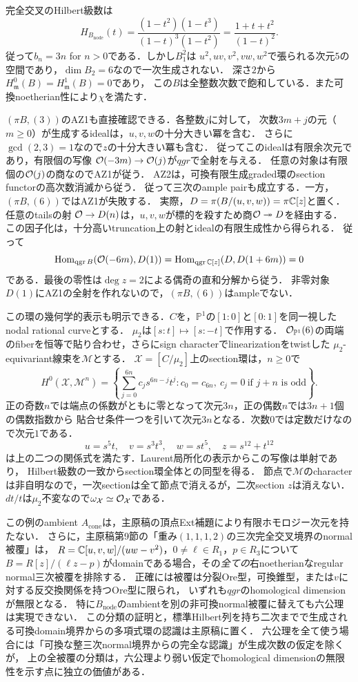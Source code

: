 \documentclass[11pt,a4paper]{ltjsarticle}
\begin{document}
完全交叉のHilbert級数は
\[
 H_{B_{\mathrm{node}}}(t)
 =\frac{(1-t^2)(1-t^3)}{(1-t)^3(1-t^2)}
 =\frac{1+t+t^2}{(1-t)^2}.
\]
従って$b_n=3n$ for $n>0$である．しかし$B_1^2$は
$u^2,uv,v^2,vw,w^2$で張られる次元$5$の空間であり，$\dim B_2=6$なので一次生成されない．
深さ$2$から$H^0_{\mathfrak m}(B)=H^1_{\mathfrak m}(B)=0$であり，
この$B$は全整数次数で飽和している．また可換noetherian性により$\chi$を満たす．

$(\pi B,(3))$のAZ1も直接確認できる．各整数$j$に対して，
次数$3m+j$の元（$m\geq0$）が生成するidealは，$u,v,w$の十分大きい冪を含む．
さらに$\gcd(2,3)=1$なので$z$の十分大きい冪も含む．
従ってこのidealは有限余次元であり，有限個の写像
$\mathcal O(-3m)\to\mathcal O(j)$が$qgr$で全射を与える．
任意の対象は有限個の$\mathcal O(j)$の商なのでAZ1が従う．
AZ2は，可換有限生成graded環のsection functorの高次数消滅から従う．
従って三次のample pairも成立する．一方，$(\pi B,(6))$ではAZ1が失敗する．
実際，$D=\pi(B/(u,v,w))=\pi\mathbb C[z]$と置く．任意のtailsの射
$\mathcal O\to D(n)$は，$u,v,w$が標的を殺すため商$\mathcal O\twoheadrightarrow D$を経由する．
この因子化は，十分高いtruncation上の射とidealの有限生成性から得られる．
従って
\[
 \operatorname{Hom}_{\operatorname{qgr} B}(\mathcal O(-6m),D(1))
 =\operatorname{Hom}_{\operatorname{qgr}\mathbb C[z]}(D,D(1+6m))=0
\]
である．最後の零性は$\deg z=2$による偶奇の直和分解から従う．
非零対象$D(1)$にAZ1の全射を作れないので，$(\pi B,(6))$はampleでない．

この環の幾何学的表示も明示できる．$C$を，$\mathbb P^1$の$[1:0]$と$[0:1]$を同一視したnodal rational curveとする．
$\mu_2$は$[s:t]\mapsto[s:-t]$で作用する．
$\mathcal O_{\mathbb P^1}(6)$の両端のfiberを恒等で貼り合わせ，さらにsign characterでlinearizationをtwistした
$\mu_2$-equivariant線束を$\mathcal M$とする．
$\mathcal X=[C/\mu_2]$上のsection環は，$n\geq0$で
\[
 H^0(\mathcal X,\mathcal M^n)
 =\left\{\sum_{j=0}^{6n}c_js^{6n-j}t^j:
 c_0=c_{6n},\ c_j=0\ \text{if }j+n\text{ is odd}\right\}.
\]
正の奇数$n$では端点の係数がともに零となって次元$3n$，正の偶数$n$では$3n+1$個の偶数指数から
貼合せ条件一つを引いて次元$3n$となる．次数$0$では定数だけなので次元$1$である．
\[
 u=s^5t,\quad v=s^3t^3,\quad w=st^5,\quad z=s^{12}+t^{12}
\]
は上の二つの関係式を満たす．Laurent局所化の表示からこの写像は単射であり，
Hilbert級数の一致からsection環全体との同型を得る．
節点で$\mathcal M$のcharacterは非自明なので，一次sectionは全て節点で消えるが，二次section $z$は消えない．
$dt/t$は$\mu_2$不変なので$\omega_{\mathcal X}\simeq\mathcal O_{\mathcal X}$である．

この例のambient $A_{\mathrm{cone}}$は，主原稿の頂点Ext補題により有限ホモロジー次元を持たない．
さらに，主原稿第9節の「重み$(1,1,1,2)$の三次完全交叉境界のnormal被覆」は，
$R=\mathbb C[u,v,w]/(uw-v^2)$，$0\ne\ell\in R_1$，$p\in R_3$について
$B=R[z]/(\ell z-p)$がdomainである場合，その\emph{全ての}右noetherianなregular normal三次被覆を排除する．
正確には被覆は分裂Ore型，可換錐型，または$v$に対する反交換関係を持つOre型に限られ，
いずれも$qgr$のhomological dimensionが無限となる．
特に$B_{\mathrm{node}}$のambientを別の非可換normal被覆に替えても六公理は実現できない．
この分類の証明と，標準Hilbert列を持ち二次までで生成される可換domain境界からの多項式環の認識は主原稿に置く．
六公理を全て使う場合には「可換な整三次normal境界からの完全な認識」が生成次数の仮定を除くが，
上の全被覆の分類は，六公理より弱い仮定でhomological dimensionの無限性を示す点に独立の価値がある．
\end{document}
